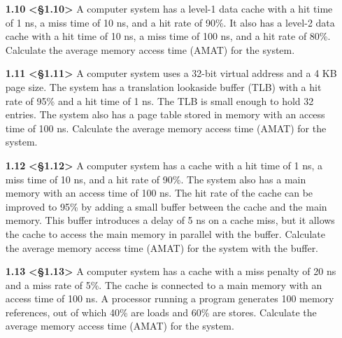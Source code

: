 \documentclass[11pt]{article}
\begin{document}


\begin{enumerate}
    \item[\textbf{1.10}] \textbf{<§1.10>} A computer system has a level-1 data cache with a hit time of 1 ns, a miss time of 10 ns, and a hit rate of 90\%. It also has a level-2 data cache with a hit time of 10 ns, a miss time of 100 ns, and a hit rate of 80\%. Calculate the average memory access time (AMAT) for the system.
\end{enumerate}


\begin{enumerate}
    \item[\textbf{1.11}] \textbf{<§1.11>} A computer system uses a 32-bit virtual address and a 4 KB page size. The system has a translation lookaside buffer (TLB) with a hit rate of 95\% and a hit time of 1 ns. The TLB is small enough to hold 32 entries. The system also has a page table stored in memory with an access time of 100 ns. Calculate the average memory access time (AMAT) for the system.
\end{enumerate}


\begin{enumerate}
    \item[\textbf{1.12}] \textbf{<§1.12>} A computer system has a cache with a hit time of 1 ns, a miss time of 10 ns, and a hit rate of 90\%. The system also has a main memory with an access time of 100 ns. The hit rate of the cache can be improved to 95\% by adding a small buffer between the cache and the main memory. This buffer introduces a delay of 5 ns on a cache miss, but it allows the cache to access the main memory in parallel with the buffer. Calculate the average memory access time (AMAT) for the system with the buffer.
\end{enumerate}


\begin{enumerate}
    \item[\textbf{1.13}] \textbf{<§1.13>} A computer system has a cache with a miss penalty of 20 ns and a miss rate of 5\%. The cache is connected to a main memory with an access time of 100 ns. A processor running a program generates 100 memory references, out of which 40\% are loads and 60\% are stores. Calculate the average memory access time (AMAT) for the system.
\end{enumerate}
\end{document}
